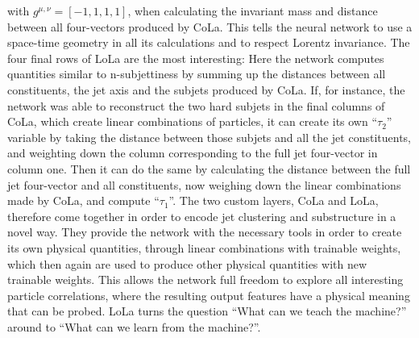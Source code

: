 with $g^{\mu,\nu}=[-1,1,1,1]$, when calculating the invariant mass and distance between all four-vectors produced by CoLa. This tells the neural network to use a space-time geometry in all its calculations and to respect Lorentz invariance. The four final rows of LoLa are the most interesting: Here the network computes quantities similar to n-subjettiness by summing up the distances between all constituents, the jet axis and the subjets produced by CoLa. If, for instance, the network was able to reconstruct the two hard subjets in the final columns of CoLa, which create linear combinations of particles, it can create its own ``$\tau_2$'' variable by taking the distance between those subjets and all the jet constituents, and weighting down the column corresponding to the full jet four-vector in column one. Then it can do the same by calculating the distance between the full jet four-vector and all constituents, now weighing down the linear combinations made by CoLa, and compute ``$\tau_1$''. The two custom layers, CoLa and LoLa, therefore come together in order to encode jet clustering and substructure in a novel way. They provide the network with the necessary tools in order to create its own physical quantities, through linear combinations with trainable weights, which then again are used to produce other physical quantities with new trainable weights. This allows the network full freedom to explore all interesting particle correlations, where the resulting output features have a physical meaning that can be probed.\newline
LoLa turns the question ``What can we teach the machine?'' around to ``What can we learn from the machine?''. 
\clearpage
